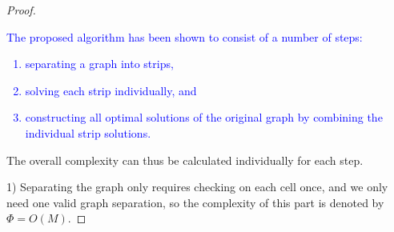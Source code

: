 \documentclass[journal]{IEEEtran}
\begin{document}
\begin{proof}
\textcolor{blue}{The proposed algorithm has been shown to consist of a number of steps: 
\begin{enumerate}
\item separating a graph into strips, 
\item solving each strip individually, and 
\item constructing all optimal solutions of the original graph by combining the individual strip solutions. 
\end{enumerate}
}
\noindent
The overall complexity can thus be calculated individually for each step. 

1) Separating the graph only requires checking on each cell once, and we only need one valid graph separation, so the complexity of this part is denoted by $\Phi = O(M)$. 


\end{proof}
\end{document}
